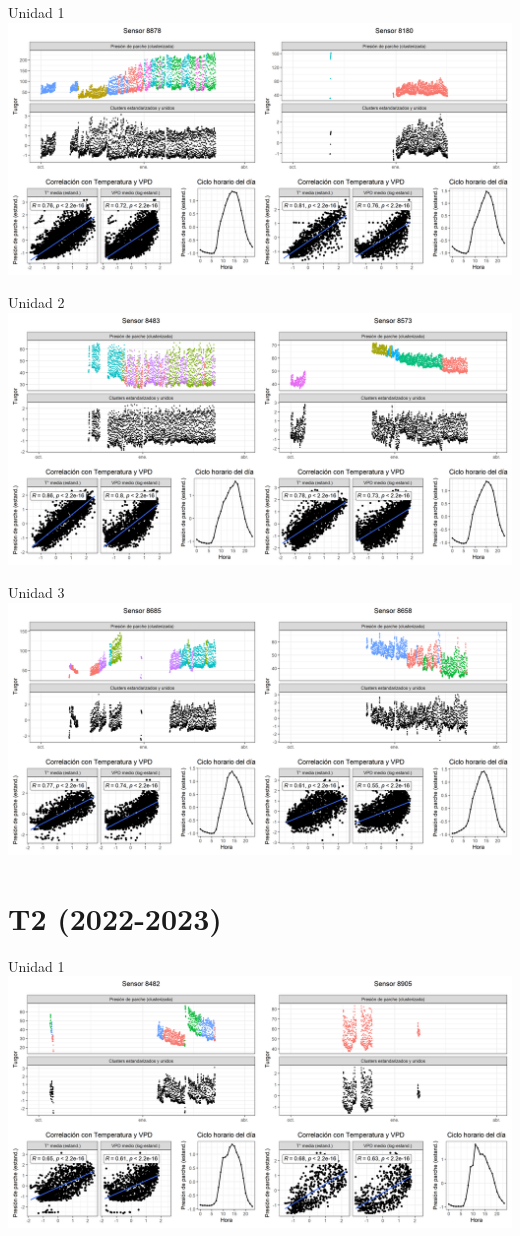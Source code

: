\documentclass[
  letterpaper,
  DIV=11,
  numbers=noendperiod]{scrreprt}
\begin{document}
Unidad 1
\includegraphics{figuras/03_turgor_union/2022_2023_La_Esperanza_T1_Unidad_1.png}

Unidad 2
\includegraphics{figuras/03_turgor_union/2022_2023_La_Esperanza_T1_Unidad_2.png}

Unidad 3
\includegraphics{figuras/03_turgor_union/2022_2023_La_Esperanza_T1_Unidad_3.png}

\chapter{T2 (2022-2023)}

Unidad 1
\includegraphics{figuras/03_turgor_union/2022_2023_La_Esperanza_T2_Unidad_1.png}
\end{document}
